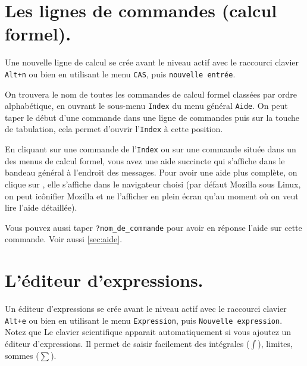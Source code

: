 \documentclass[a4paper,11pt]{article}
\begin{document}
\section{Les lignes de commandes (calcul formel).}
Une nouvelle ligne de calcul se cr\'ee avant le niveau actif avec le raccourci 
clavier {\tt Alt+n} ou bien en utilisant le menu {\tt CAS},
 puis {\tt nouvelle entr\'ee}.

On trouvera le nom de toutes les commandes de calcul formel class\'ees par 
ordre alphab\'etique, en ouvrant le sous-menu {\tt Index} du menu 
g\'en\'eral {\tt Aide}.
On peut taper le d\'ebut d'une commande dans une ligne de commandes puis sur la
 touche de tabulation, cela permet d'ouvrir
l'{\tt Index} \`a cette position.

En cliquant sur une commande de l'{\tt Index} ou sur une commande situ\'ee 
dans un des menus de calcul formel, vous avez une 
aide succincte qui s'affiche dans 
le bandeau g\'en\'eral \`a l'endroit des messages. Pour avoir une
aide plus compl\`ete, on clique sur ,
elle s'affiche dans le navigateur choisi (par d\'efaut Mozilla sous
Linux, on peut  
ic\^onifier Mozilla et ne l'afficher en plein \'ecran 
qu'au moment o\`u on veut lire l'aide d\'etaill\'ee).

Vous pouvez aussi taper {\tt ?nom\_de\_commande} pour avoir en 
r\'eponse l'aide sur cette commande. Voir aussi \ref{sec:aide}.


\section{L'\'editeur d'expressions.} \label{sec:eqw}
Un \'editeur d'expressions se cr\'ee avant le niveau actif avec le raccourci 
clavier {\tt Alt+e} ou bien en utilisant le menu {\tt Expression},
 puis {\tt Nouvelle expression}.
Notez que Le clavier scientifique apparait automatiquement si vous
ajoutez un \'editeur d'expressions. Il permet de saisir facilement
des int\'egrales ($\int$), limites, sommes ($\sum$).
\end{document}
